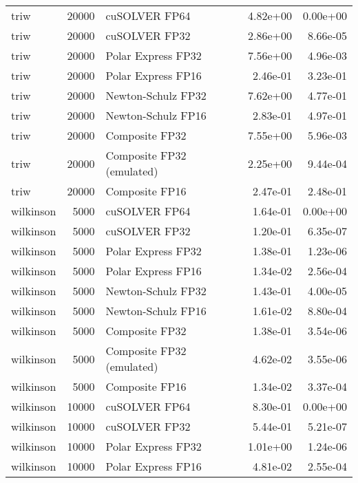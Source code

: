 \begin{table}
\begin{tabular}{lrlrr}
     triw & 20000 &             cuSOLVER FP64 &  4.82e+00 &        0.00e+00 \\
     triw & 20000 &             cuSOLVER FP32 &  2.86e+00 &        8.66e-05 \\
     triw & 20000 &        Polar Express FP32 &  7.56e+00 &        4.96e-03 \\
     triw & 20000 &        Polar Express FP16 &  2.46e-01 &        3.23e-01 \\
     triw & 20000 &        Newton-Schulz FP32 &  7.62e+00 &        4.77e-01 \\
     triw & 20000 &        Newton-Schulz FP16 &  2.83e-01 &        4.97e-01 \\
     triw & 20000 &            Composite FP32 &  7.55e+00 &        5.96e-03 \\
     triw & 20000 & Composite FP32 (emulated) &  2.25e+00 &        9.44e-04 \\
     triw & 20000 &            Composite FP16 &  2.47e-01 &        2.48e-01 \\
wilkinson &  5000 &             cuSOLVER FP64 &  1.64e-01 &        0.00e+00 \\
wilkinson &  5000 &             cuSOLVER FP32 &  1.20e-01 &        6.35e-07 \\
wilkinson &  5000 &        Polar Express FP32 &  1.38e-01 &        1.23e-06 \\
wilkinson &  5000 &        Polar Express FP16 &  1.34e-02 &        2.56e-04 \\
wilkinson &  5000 &        Newton-Schulz FP32 &  1.43e-01 &        4.00e-05 \\
wilkinson &  5000 &        Newton-Schulz FP16 &  1.61e-02 &        8.80e-04 \\
wilkinson &  5000 &            Composite FP32 &  1.38e-01 &        3.54e-06 \\
wilkinson &  5000 & Composite FP32 (emulated) &  4.62e-02 &        3.55e-06 \\
wilkinson &  5000 &            Composite FP16 &  1.34e-02 &        3.37e-04 \\
wilkinson & 10000 &             cuSOLVER FP64 &  8.30e-01 &        0.00e+00 \\
wilkinson & 10000 &             cuSOLVER FP32 &  5.44e-01 &        5.21e-07 \\
wilkinson & 10000 &        Polar Express FP32 &  1.01e+00 &        1.24e-06 \\
wilkinson & 10000 &        Polar Express FP16 &  4.81e-02 &        2.55e-04 \\

\end{tabular}
\end{table}
